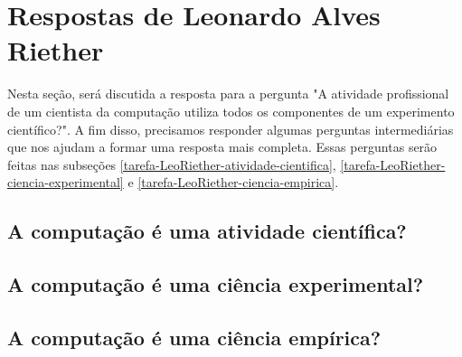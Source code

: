 \section{Respostas de Leonardo Alves Riether\label{tarefa-LeoRiether-componentes-eperimento}}

Nesta seção, será discutida a resposta para a pergunta "A atividade profissional
de um cientista da computação utiliza todos os componentes de um experimento
científico?". A fim disso, precisamos responder algumas perguntas intermediárias
que nos ajudam a formar uma resposta mais completa. Essas perguntas serão feitas
nas subseções \ref{tarefa-LeoRiether-atividade-cientifica},
\ref{tarefa-LeoRiether-ciencia-experimental} e
\ref{tarefa-LeoRiether-ciencia-empirica}.

\subsection{A computação é uma atividade científica?\label{tarefa-LeoRiether-atividade-cientifica}}

\subsection{A computação é uma ciência experimental?  \label{tarefa-LeoRiether-ciencia-experimental}}


\subsection{A computação é uma ciência empírica?  \label{tarefa-LeoRiether-ciencia-empirica}}

